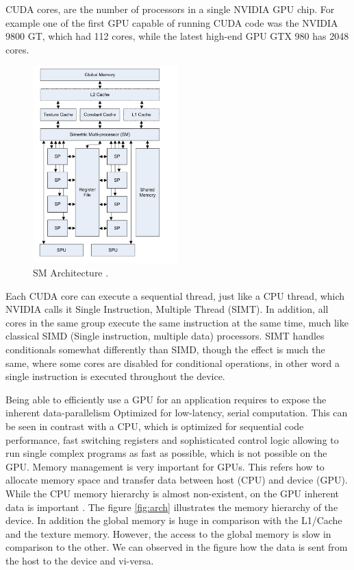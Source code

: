 CUDA cores, are the number of processors in a single NVIDIA GPU chip. For example one of the first GPU capable of running CUDA code was the NVIDIA 9800 GT, which had 112 cores, while the latest high-end GPU GTX 980 has 2048 cores.

\begin{figure}[htbp]
	\centering
		\includegraphics[width=0.5\textwidth]{Figures/GPU_CPU.png}
		\smallskip
	\caption[Architecture of a SM]{SM Architecture \cite{cook}.}
	\label{fig:gpu_cpu}
\end{figure}


Each CUDA core can execute a sequential thread, just like a CPU thread, which NVIDIA calls it Single Instruction, Multiple Thread (SIMT). In addition, all cores in the same group execute the same instruction at the same time, much like classical SIMD (Single instruction, multiple data) processors. SIMT handles conditionals somewhat differently than SIMD, though the effect is much the same, where some cores are disabled for conditional operations, in other word a single instruction is executed throughout the device.

Being able to efficiently use a GPU for an application requires to expose the inherent data-parallelism Optimized for low-latency, serial computation. This can be seen in contrast with a CPU, which is optimized for sequential code performance, fast switching registers  and sophisticated control logic allowing to run single complex programs as fast as possible, which is not possible on the GPU. Memory management is very important for GPUs. This refers how to allocate memory space and transfer data between host (CPU) and device (GPU). While the CPU memory hierarchy is almost non-existent, on the GPU inherent data is important \cite{hwu}. The figure \ref{fig:arch} illustrates the memory hierarchy of the device. In addition the global memory is huge in comparison with the L1/Cache and the texture memory. However, the access to the global memory is slow in comparison to the other. We can observed in the figure how the data is sent from the host to the device and vi-versa.

